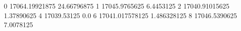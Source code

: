 0 17064.19921875 24.66796875
1 17045.9765625 6.4453125
2 17040.91015625 1.37890625
4 17039.53125 0.0
6 17041.017578125 1.486328125
8 17046.5390625 7.0078125

